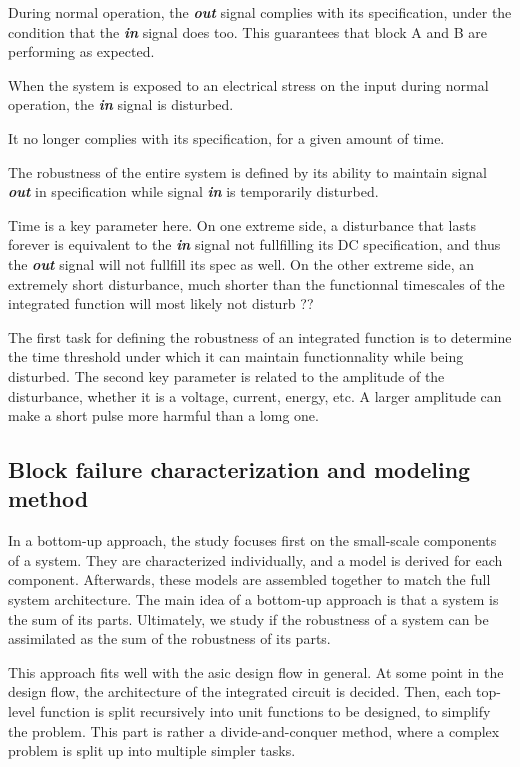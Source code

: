 During normal operation, the \textbf{\textit{out}} signal complies with its specification,
under the condition that the \textbf{\textit{in}} signal does too.
This guarantees that block A and B are performing as expected.

When the system is exposed to an electrical stress on the input during normal operation,
the \textbf{\textit{in}} signal is disturbed.

It no longer complies with its specification, for a given amount of time.

The robustness of the entire system is defined by its ability to maintain signal \textbf{\textit{out}} in specification
while signal \textbf{\textit{in}} is temporarily disturbed.

Time is a key parameter here. On one extreme side, a disturbance that lasts forever is equivalent to the \textbf{\textit{in}} signal not fullfilling its DC specification,
and thus the \textbf{\textit{out}} signal will not fullfill its spec as well.
On the other extreme side, an extremely short disturbance, much shorter than the functionnal timescales of the integrated function will most likely not disturb ??

The first task for defining the robustness of an integrated function is to determine the time threshold under which it can maintain functionnality while being disturbed.
The second key parameter is related to the amplitude of the disturbance, whether it is a voltage, current, energy, etc.
A larger amplitude can make a short pulse more harmful than a lomg one.

\subsection{Block failure characterization and modeling method}
\label{sec:block-failure-cz}

In a bottom-up approach, the study focuses first on the small-scale components of a system.
They are characterized individually, and a model is derived for each component.
Afterwards, these models are assembled together to match the full system architecture.
The main idea of a bottom-up approach is that a system is the sum of its parts.
Ultimately, we study if the robustness of a system can be assimilated as the sum of the robustness of its parts.

This approach fits well with the \gls{asic} design flow in general.
At some point in the design flow, the architecture of the integrated circuit is decided.
Then, each top-level function is split recursively into unit functions to be designed, to simplify the problem.
This part is rather a divide-and-conquer method, where a complex problem is split up into multiple simpler tasks.

